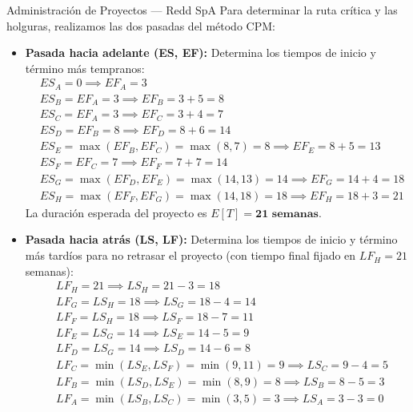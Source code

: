 \documentclass[11pt, a4paper]{article}
\begin{document}
\begin{ejercicio}{Administración de Proyectos --- Redd SpA}
  \medskip
  Para determinar la ruta crítica y las holguras, realizamos las dos pasadas del método CPM:
  \begin{itemize}
    \item \textbf{Pasada hacia adelante (ES, EF):} Determina los tiempos de inicio y término más tempranos:
      \begin{align*}
        & ES_A = 0 \implies EF_A = 3 \\
        & ES_B = EF_A = 3 \implies EF_B = 3 + 5 = 8 \\
        & ES_C = EF_A = 3 \implies EF_C = 3 + 4 = 7 \\
        & ES_D = EF_B = 8 \implies EF_D = 8 + 6 = 14 \\
        & ES_E = \max(EF_B, EF_C) = \max(8, 7) = 8 \implies EF_E = 8 + 5 = 13 \\
        & ES_F = EF_C = 7 \implies EF_F = 7 + 7 = 14 \\
        & ES_G = \max(EF_D, EF_E) = \max(14, 13) = 14 \implies EF_G = 14 + 4 = 18 \\
        & ES_H = \max(EF_F, EF_G) = \max(14, 18) = 18 \implies EF_H = 18 + 3 = 21
      \end{align*}
      La duración esperada del proyecto es $E[T] = \mathbf{21 \text{ semanas}}$.

    \item \textbf{Pasada hacia atrás (LS, LF):} Determina los tiempos de inicio y término más tardíos para no retrasar el proyecto (con tiempo final fijado en $LF_H = 21$ semanas):
      \begin{align*}
        & LF_H = 21 \implies LS_H = 21 - 3 = 18 \\
        & LF_G = LS_H = 18 \implies LS_G = 18 - 4 = 14 \\
        & LF_F = LS_H = 18 \implies LS_F = 18 - 7 = 11 \\
        & LF_E = LS_G = 14 \implies LS_E = 14 - 5 = 9 \\
        & LF_D = LS_G = 14 \implies LS_D = 14 - 6 = 8 \\
        & LF_C = \min(LS_E, LS_F) = \min(9, 11) = 9 \implies LS_C = 9 - 4 = 5 \\
        & LF_B = \min(LS_D, LS_E) = \min(8, 9) = 8 \implies LS_B = 8 - 5 = 3 \\
        & LF_A = \min(LS_B, LS_C) = \min(3, 5) = 3 \implies LS_A = 3 - 3 = 0
      \end{align*}
  \end{itemize}


\end{ejercicio}
\end{document}
